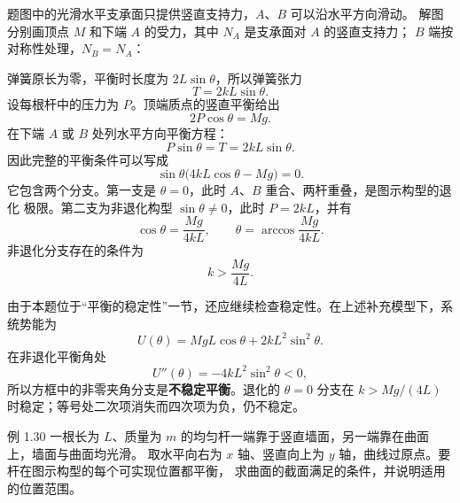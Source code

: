 \begin{xesolution}
题图中的光滑水平支承面只提供竖直支持力，$A$、$B$ 可以沿水平方向滑动。
解图分别画顶点 $M$ 和下端 $A$ 的受力，其中 $N_A$ 是支承面对 $A$ 的竖直支持力；
$B$ 端按对称性处理，$N_B=N_A$：
\soldiagOneTwentyNine

弹簧原长为零，平衡时长度为 $2L\sin\theta$，所以弹簧张力
\[
  T=2kL\sin\theta.
\]
设每根杆中的压力为 $P$。顶端质点的竖直平衡给出
\[
  2P\cos\theta=Mg.
\]
在下端 $A$ 或 $B$ 处列水平方向平衡方程：
\[
  P\sin\theta=T=2kL\sin\theta.
\]
因此完整的平衡条件可以写成
\[
  \sin\theta\bigl(4kL\cos\theta-Mg\bigr)=0.
\]
它包含两个分支。第一支是 $\theta=0$，此时 $A$、$B$ 重合、两杆重叠，是图示构型的退化
极限。第二支为非退化构型 $\sin\theta\ne0$，此时 $P=2kL$，并有
\[
  \boxed{\cos\theta=\frac{Mg}{4kL}},
  \qquad
  \boxed{\theta=\arccos\frac{Mg}{4kL}}.
\]
非退化分支存在的条件为
\[
  \boxed{k>\frac{Mg}{4L}}.
\]

由于本题位于“平衡的稳定性”一节，还应继续检查稳定性。在上述补充模型下，系统势能为
\[
  U(\theta)=MgL\cos\theta+2kL^2\sin^2\theta.
\]
在非退化平衡角处
\[
  U''(\theta)=-4kL^2\sin^2\theta<0,
\]
所以方框中的非零夹角分支是\textbf{不稳定平衡}。退化的 $\theta=0$ 分支在
$k>Mg/(4L)$ 时稳定；等号处二次项消失而四次项为负，仍不稳定。
\end{xesolution}

\begin{origexamplebox}{例 1.30}
一根长为 $L$、质量为 $m$ 的均匀杆一端靠于竖直墙面，另一端靠在曲面上，墙面与曲面均光滑。
取水平向右为 $x$ 轴、竖直向上为 $y$ 轴，曲线过原点。要杆在图示构型的每个可实现位置都平衡，
求曲面的截面满足的条件，并说明适用的位置范围。
\end{origexamplebox}

